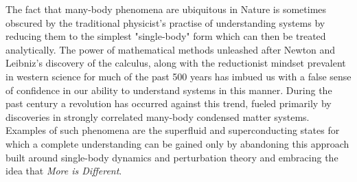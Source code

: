 \documentclass[11pt,english,rmp]{revtex4}
\begin{document}
The fact that many-body phenomena are ubiquitous in Nature is sometimes obscured by the traditional physicist's practise of understanding systems  by reducing them to the simplest "single-body" form which can then be treated analytically. The power of mathematical methods unleashed after Newton and Leibniz's discovery of the calculus, along with the reductionist mindset prevalent in western science for much of the past 500 years has imbued us with a false sense of confidence in our ability to understand systems in this manner. During the past century a revolution has occurred against this trend, fueled primarily by discoveries in strongly correlated many-body condensed matter systems. Examples of such phenomena are the superfluid and superconducting states for which a complete understanding can be gained only by abandoning this approach built around single-body dynamics and perturbation theory and embracing the idea that \emph{More is Different}\cite{Anderson1972More}. 



\end{document}
